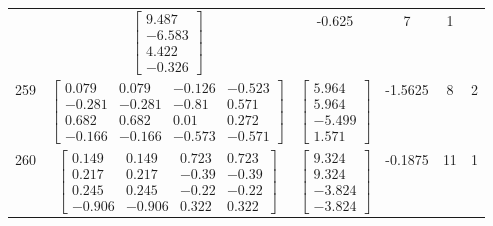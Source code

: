 \documentclass[a4paper,12pt]{article}
\begin{document}
\begin{tabular}{c c c c c c}
&
$\begin{bmatrix} 9.487 \\ -6.583 \\ 4.422 \\ -0.326 \end{bmatrix}$
&
-0.625
&
7
&
1
\\
259
&
$\begin{bmatrix} 0.079 & 0.079 & -0.126 & -0.523 \\ -0.281 & -0.281 & -0.81 & 0.571 \\ 0.682 & 0.682 & 0.01 & 0.272 \\ -0.166 & -0.166 & -0.573 & -0.571 \end{bmatrix}$
&
$\begin{bmatrix} 5.964 \\ 5.964 \\ -5.499 \\ 1.571 \end{bmatrix}$
&
-1.5625
&
8
&
2
\\
260
&
$\begin{bmatrix} 0.149 & 0.149 & 0.723 & 0.723 \\ 0.217 & 0.217 & -0.39 & -0.39 \\ 0.245 & 0.245 & -0.22 & -0.22 \\ -0.906 & -0.906 & 0.322 & 0.322 \end{bmatrix}$
&
$\begin{bmatrix} 9.324 \\ 9.324 \\ -3.824 \\ -3.824 \end{bmatrix}$
&
-0.1875
&
11
&
1
\\
\end{tabular} \egroup \newpage
\end{document}
